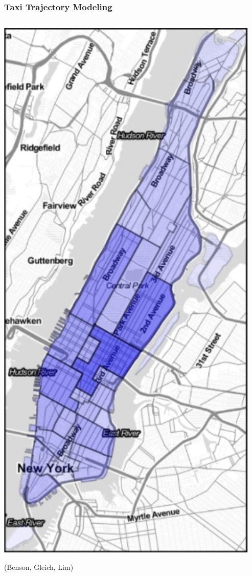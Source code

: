 \documentclass{beamer}
\begin{document}
\begin{frame}
	\frametitle{Taxi Trajectory Modeling}
	\begin{columns}
		\begin{column}{0.3\linewidth}
			\includegraphics[width=\linewidth]{images/nytaxi.png}
			\begin{tiny}
				\begin{center}
					(Benson, Gleich, Lim)
				\end{center}
			\end{tiny}
		\end{column}


\end{columns}
\end{frame}
\end{document}
